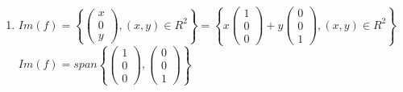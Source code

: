\documentclass[notitlepage]{math}
\begin{document}
\begin{enumerate}[label=\protect\circled{\arabic*}]
    \item $Im(f) = \left\{ \begin{pmatrix} x \\ 0 \\ y \end{pmatrix}, (x,y) \in R^2 \right\} = \left\{ x \begin{pmatrix} 1 \\ 0 \\ 0 \end{pmatrix} + y \begin{pmatrix} 0 \\ 0 \\ 1 \end{pmatrix}, (x,y) \in R^2 \right\}$ 
    \\$Im(f) = span\left\{ \begin{pmatrix} 1 \\ 0 \\ 0 \end{pmatrix}, \begin{pmatrix} 0 \\ 0 \\ 1 \end{pmatrix} \right\}$
\end{enumerate}
\end{document}
